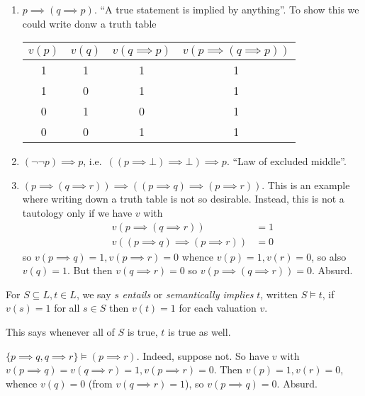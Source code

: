 \documentclass[a4paper]{article}
\begin{document}
\begin{eg}\leavevmode
  \begin{enumerate}
  \item \(p \implies (q \implies p)\). ``A true statement is implied by anything''. To show this we could write donw a truth table
    \begin{table}[h]
      \centering
      \begin{tabular}{c|c|c|c}
        \(v(p)\) & \(v(q)\) & \(v(q \implies p)\) & \(v(p \implies (q \implies p))\) \\\hline
        1 & 1 & 1 & 1 \\
        1 & 0 & 1 & 1 \\
        0 & 1 & 0 & 1 \\
        0 & 0 & 1 & 1
      \end{tabular}
    \end{table}
  \item \((\neg \neg p) \implies p\), i.e.\ \(((p \implies \bot) \implies \bot) \implies p\). ``Law of excluded middle''.
  \item \((p \implies (q \implies r)) \implies ((p \implies q) \implies (p \implies r))\). This is an example where writing down a truth table is not so desirable. Instead, this is not a tautology only if we have \(v\) with
    \begin{align*}
      v(p \implies (q\implies r)) &= 1 \\
      v((p \implies q) \implies (p \implies r)) &= 0
    \end{align*}
    so \(v(p \implies q) = 1, v(p \implies r) = 0\) whence \(v(p) = 1, v(r) = 0\), so also \(v(q) = 1\). But then \(v(q \implies r) = 0\) so \(v(p \implies (q \implies r)) = 0\). Absurd.
  \end{enumerate}
\end{eg}

\begin{definition}
  For \(S \subseteq L, t \in L\), we say \(s\) \emph{entails} or \emph{semantically implies} \(t\), written \(S \models t\), if \(v(s) = 1\) for all \(s \in S\) then \(v(t) = 1\) for each valuation \(v\).
\end{definition}

This says whenever all of \(S\) is true, \(t\) is true as well.

\begin{eg}
  \(\{p \implies q, q \implies r\} \models (p \implies r)\). Indeed, suppose not. So have \(v\) with \(v(p \implies q) = v(q \implies r) = 1, v(p \implies r) = 0\). Then \(v(p) = 1, v(r) = 0\), whence \(v(q) = 0\) (from \(v(q \implies r) = 1\)), so \(v(p \implies q) = 0\). Absurd.
\end{eg}
\end{document}
